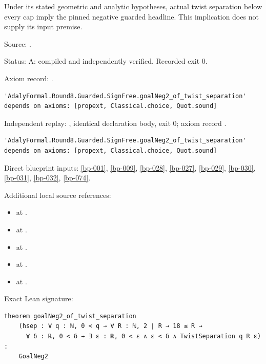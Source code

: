 \begin{theorem}[bp-256]
\label{bp-256}
\leanok
Under its stated geometric and analytic hypotheses, actual twist separation below every cap imply the pinned negative guarded headline. This implication does not supply its input premise.

\par Source: \texttt{}.
\par Status: A: compiled and independently verified. Recorded exit 0.
\par Axiom record: \texttt{}.
\begin{verbatim}
'AdalyFormal.Round8.Guarded.SignFree.goalNeg2_of_twist_separation' depends on axioms: [propext, Classical.choice, Quot.sound]
\end{verbatim}
\par Independent replay: \texttt{}, identical declaration body, exit 0; axiom record \texttt{}.
\begin{verbatim}
'AdalyFormal.Round8.Guarded.SignFree.goalNeg2_of_twist_separation' depends on axioms: [propext, Classical.choice, Quot.sound]
\end{verbatim}
\par Direct blueprint inputs: \ref{bp-001}, \ref{bp-009}, \ref{bp-028}, \ref{bp-027}, \ref{bp-029}, \ref{bp-030}, \ref{bp-031}, \ref{bp-032}, \ref{bp-074}.
\par Additional local source references:
\begin{itemize}
\item \texttt{} at \texttt{}.
\item \texttt{} at \texttt{}.
\item \texttt{} at \texttt{}.
\item \texttt{} at \texttt{}.
\item \texttt{} at \texttt{}.
\end{itemize}
\par Exact Lean signature:
\begin{verbatim}
theorem goalNeg2_of_twist_separation
    (hsep : ∀ q : ℕ, 0 < q → ∀ R : ℕ, 2 ∣ R → 18 ≤ R →
      ∀ δ : ℝ, 0 < δ → ∃ ε : ℝ, 0 < ε ∧ ε < δ ∧ TwistSeparation q R ε) :
    GoalNeg2
\end{verbatim}
\end{theorem}

